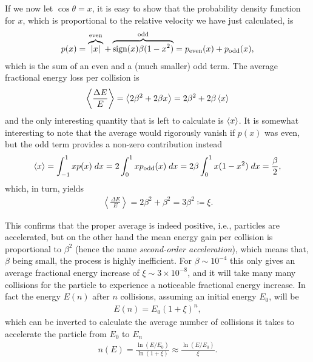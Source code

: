If we now let $\cos\theta = x$, it is easy to show that the probability density
function for $x$, which is proportional to the relative velocity we have just calculated,
is
\begin{align}\label{eq:fermi_average_pdf}
  p(x) = \overbrace{\abs{x}}^\text{even} +
  \overbrace{\text{sign}(x) \beta (1 - x^2)}^\text{odd} =
  p_\text{even}(x) + p_\text{odd}(x),
\end{align}
which is the sum of an even and a (much smaller) odd term. The average fractional
energy loss per collision is
\begin{align*}
  \left<\frac{\Delta E}{E}\right> = \left<2\beta^2 + 2\beta x\right> = 2\beta^2 + 2\beta \left<x\right>
\end{align*}
and the only interesting quantity that is left to calculate is $\left<x\right>$. It is
somewhat interesting to note that the average would rigorously vanish if $p(x)$
was even, but the odd term provides a non-zero contribution instead
\begin{align*}
  \left<x\right> =
  \int_{-1}^1 x p(x) \;d{x} =
  2\int_0^1 x p_\text{odd}(x) \;d{x} =
  2\beta \int_{0}^1 x (1 - x^2) \;d{x} =
  \frac{\beta}{2},
\end{align*}
which, in turn, yields
\begin{align}\label{eq:fermi_average}
  \left< \frac{\Delta E}{E} \right> = 2 \beta^2 + \beta^2 =
  3 \beta^2 \coloneqq \xi.
\end{align}

This confirms that the proper average is indeed positive, i.e., particles are accelerated,
but on the other hand the mean energy gain per collision is proportional to $\beta^2$
(hence the name \emph{second-order acceleration}), which means that, $\beta$ being
small, the process is highly inefficient. For $\beta \sim 10^{-4}$ this only gives
an average fractional energy increase of $\xi \sim 3 \times 10^{-8}$, and it will
take many many collisions for the particle to experience a noticeable fractional
energy increase. In fact the energy $E(n)$ after $n$ collisions, assuming an initial
energy $E_0$, will be
\begin{align*}
  E(n) = E_0 \left( 1 + \xi \right)^n,
\end{align*}
which can be inverted to calculate the average number of collisions it takes to
accelerate the particle from $E_0$ to $E_n$
\begin{align}\label{eq:fermi_accel_num_collisions}
  n(E) = \frac{\ln(E / E_0)}{\ln(1 + \xi)} \approx \frac{\ln(E / E_0)}{\xi}.
\end{align}

